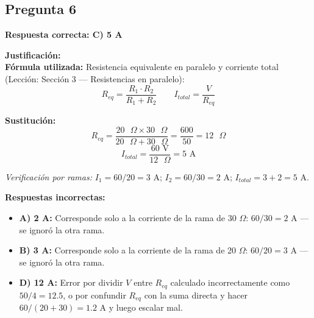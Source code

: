 \begin{respuestabox}
\subsection{Pregunta 6}
\textcolor{verdecorrecto}{\textbf{Respuesta correcta: C) 5 A}}

\textbf{Justificación:}\\
\textbf{Fórmula utilizada:} Resistencia equivalente en paralelo y corriente total (Lección: Sección 3 — Resistencias en paralelo):
$$R_{eq} = \frac{R_1 \cdot R_2}{R_1 + R_2} \qquad I_{total} = \frac{V}{R_{eq}}$$

\textbf{Sustitución:}
$$R_{eq} = \frac{20 \text{ }\Omega \times 30 \text{ }\Omega}{20 \text{ }\Omega + 30 \text{ }\Omega} = \frac{600}{50} = 12 \text{ }\Omega$$
$$I_{total} = \frac{60 \text{ V}}{12 \text{ }\Omega} = 5 \text{ A}$$

\textit{Verificación por ramas:} $I_1 = 60/20 = 3$ A; $I_2 = 60/30 = 2$ A; $I_{total} = 3 + 2 = 5$ A. \checkmark

\textbf{Respuestas incorrectas:}
\begin{itemize}
    \item \textbf{A) 2 A:} Corresponde solo a la corriente de la rama de 30 $\Omega$: $60/30 = 2$ A — se ignoró la otra rama.
    \item \textbf{B) 3 A:} Corresponde solo a la corriente de la rama de 20 $\Omega$: $60/20 = 3$ A — se ignoró la otra rama.
    \item \textbf{D) 12 A:} Error por dividir $V$ entre $R_{eq}$ calculado incorrectamente como $50/4 = 12.5$, o por confundir $R_{eq}$ con la suma directa y hacer $60/(20+30) = 1.2$ A y luego escalar mal.
\end{itemize}
\end{respuestabox}

